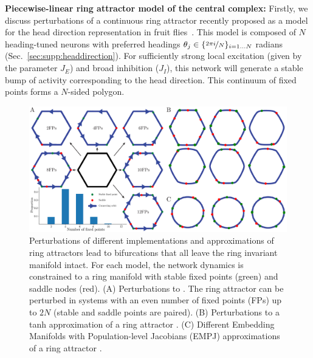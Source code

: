 \documentclass{article} %
\newcommand{\ptitle}[1]{\textbf{#1:}\xspace}
\newcounter{ct}
\theoremstyle{definition}
\theoremstyle{remark}
\begin{document}
\ptitle{Piecewise-linear ring attractor model of the central complex}
Firstly, we discuss perturbations of a continuous ring attractor recently proposed as a model for the head direction representation in fruit flies~\citep{noorman2024accurate}.
This model is composed of \(N\) heading-tuned neurons with preferred headings \(\theta_{j} \in \{\nicefrac{2\pi i}{N}\}_{i = 1\dots N}\) radians (Sec.~\ref{sec:supp:headdirection}).
For sufficiently strong local excitation (given by the parameter \(J_{E}\)) and broad inhibition (\(J_{I}\)), this network will generate a stable bump of activity corresponding to the head direction.
This continuum of fixed points forms a \(N\)-sided polygon. %

\begin{figure}[tbhp]
     \centering
  \includegraphics[width=.8\textwidth]{bio_rings_ss}
       \caption{ Perturbations of different implementations and approximations of ring attractors lead to bifurcations that all leave the ring invariant manifold intact. For each model, the network dynamics is constrained to a ring manifold with stable fixed points (green) and saddle nodes (red).
       (A) 	Perturbations to \citet{noorman2024accurate}. The ring attractor can be perturbed in systems with an even number of fixed points (FPs) up to \(2N\) (stable and saddle points are paired).
       (B) 	Perturbations to a tanh approximation of a ring attractor \citet{seeholzer2017efficient}.
       (C) 	Different Embedding Manifolds with Population-level Jacobians (EMPJ) approximations of a ring attractor \citep{pollock2020}.
       }\label{fig:bio_rings}
\end{figure}
\end{document}
